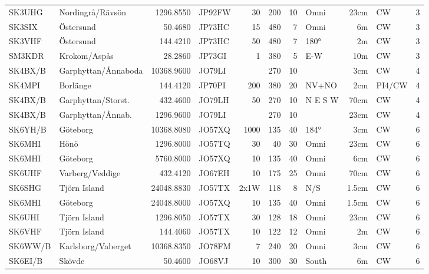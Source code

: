 \begin{longtable}{llrlrrrlrll}
	SK3UHG   & Nordingrå/Rävsön    &  1296.8550 & JP92FW &   30 &  200 &   10 & Omni    &  23cm & CW     & 3    \\
	SK3SIX   & Östersund           &    50.4680 & JP73HC &   15 &  480 &    7 & Omni    &    6m & CW     & 3    \\
	SK3VHF   & Östersund           &   144.4210 & JP73HC &   50 &  480 &    7 & 180°    &    2m & CW     & 3    \\
	SM3KDR   & Krokom/Aspås        &    28.2860 & JP73GI &    1 &  380 &    5 & E-W     &   10m & CW     & 3    \\
	SK4BX/B  & Garphyttan/Ånnaboda & 10368.9600 & JO79LI &      &  270 &   10 &         &   3cm & CW     & 4    \\
	SK4MPI   & Borlänge            &   144.4120 & JP70PI &  200 &  380 &   20 & NV+NO   &   2cm & PI4/CW & 4    \\
	SK4BX/B  & Garphyttan/Storst.  &   432.4600 & JO79LH &   50 &  270 &   10 & N E S W &  70cm & CW     & 4    \\
	SK4BX/B  & Garphyttan/Ånnab.   &  1296.9600 & JO79LI &      &  270 &   10 &         &  23cm & CW     & 4    \\
	SK6YH/B  & Göteborg            & 10368.8080 & JO57XQ & 1000 &  135 &   40 & 184°    &   3cm & CW     & 6    \\
	SK6MHI   & Hönö                &  1296.8000 & JO57TQ &   30 &   40 &   30 & Omni    &  23cm & CW     & 6    \\
	SK6MHI   & Göteborg            &  5760.8000 & JO57XQ &   10 &  135 &   40 & Omni    &   6cm & CW     & 6    \\
	SK6UHF   & Varberg/Veddige     &   432.4120 & JO67EH &   10 &  175 &   25 & Omni    &  70cm & CW     & 6    \\
	SK6SHG   & Tjörn Island        & 24048.8830 & JO57TX & 2x1W &  118 &    8 & N/S     & 1.5cm & CW     & 6    \\
	SK6MHI   & Göteborg            & 24048.8000 & JO57XQ &   10 &  135 &   40 & Omni    & 1.5cm & CW     & 6    \\
	SK6UHI   & Tjörn Island        &  1296.8050 & JO57TX &   30 &  128 &   18 & Omni    &  23cm & CW     & 6    \\
	SK6VHF   & Tjörn Island        &   144.4060 & JO57TX &   10 &  122 &   12 & Omni    &    2m & CW     & 6    \\
	SK6WW/B  & Karlsborg/Vaberget  & 10368.8350 & JO78FM &    7 &  240 &   20 & Omni    &   3cm & CW     & 6    \\
	SK6EI/B  & Skövde              &    50.4600 & JO68VJ &   10 &  300 &   30 & South   &    6m & CW     & 6    \\

\end{longtable}
